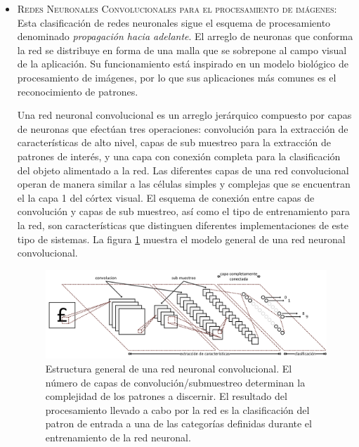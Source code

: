 \begin{itemize}
			\item 	\textsc{Redes Neuronales Convolucionales para el procesamiento de imágenes}\cite{chapter0:Ciresan:2011:FHP:2283516.2283603}: Esta clasificación de redes neuronales sigue el esquema de procesamiento denominado \textit{propagación hacia adelante}. El arreglo de neuronas que conforma la red se distribuye en forma de una malla que se sobrepone al campo visual de la aplicación. Su funcionamiento está inspirado en un modelo biológico de procesamiento de imágenes, por lo que sus aplicaciones más comunes es el reconocimiento de patrones.

			Una red neuronal convolucional es un arreglo jerárquico compuesto por capas de neuronas que efectúan tres operaciones: convolución para la extracción de características de alto nivel, capas de sub muestreo para la extracción de patrones de interés, y una capa con conexión completa para la clasificación del objeto alimentado a la red. Las diferentes capas de una red convolucional operan de manera similar a las células simples y complejas que se encuentran el la capa 1 del córtex visual\cite{chapter0:TJP:TJP19591483574}. El esquema de conexión entre capas de convolución y capas de sub muestreo, así como el tipo de entrenamiento para la red, son características que distinguen diferentes implementaciones de este tipo de sistemas. La figura \ref{fig:ch0_convolutional_networks} muestra el modelo general de una red neuronal convolucional.

			\begin{figure}
					\begin{center}
						\includegraphics[scale = 0.5]{figures/ch0_convolutional_networks.png}
					\end{center}
					\caption
						{	
							Estructura general de una red neuronal convolucional. El número de capas de convolución/submuestreo determinan la complejidad de los patrones a discernir. El resultado del procesamiento llevado a cabo por la red es la clasificación del patron de entrada a una de las categorías definidas durante el entrenamiento de la red neuronal.
						}
					\label{fig:ch0_convolutional_networks}
				\end{figure}



\end{itemize}
